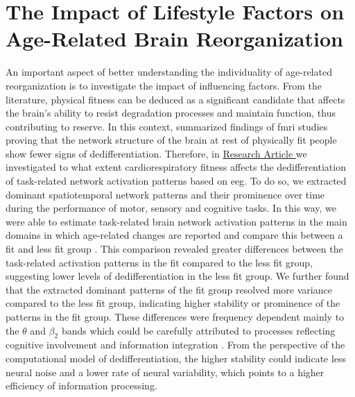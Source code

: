 \section{The Impact of Lifestyle Factors on Age-Related Brain Reorganization}
An important aspect of better understanding the individuality of age-related reorganization is to investigate the impact of influencing factors. From the literature, physical fitness can be deduced as a significant candidate that affects the brain's ability to resist degradation processes and maintain function, thus contributing to reserve. In this context, \citeauthor{Stillman2019} \cite{Stillman2019} summarized findings of \gls{fmri} studies proving that the network structure of the brain at rest of physically fit people show fewer signs of dedifferentiation. Therefore, in \hyperref[results:paperIII]{Research Article } we investigated to what extent cardiorespiratory fitness affects the dedifferentiation of task-related network activation patterns based on \gls{eeg}. To do so, we extracted dominant spatiotemporal network patterns and their prominence over time during the performance of motor, sensory and cognitive tasks. In this way, we were able to estimate task-related brain network activation patterns in the main domains in which age-related changes are reported and compare this between a fit and less fit group \cite{Baltes1997, Sala-Llonch2015, Park2009}. This comparison revealed greater differences between the task-related activation patterns in the fit compared to the less fit group, suggesting lower levels of dedifferentiation in the less fit group. We further found that the extracted dominant patterns of the fit group resolved more variance compared to the less fit group, indicating higher stability or prominence of the patterns in the fit group. These differences were frequency dependent mainly to the $\theta$ and $\beta_2$ bands which could be carefully attributed to processes reflecting cognitive involvement and information integration \cite{Siegel2012}. From the perspective of the computational model of dedifferentiation, the higher stability could indicate less neural noise and a lower rate of neural variability, which points to a higher efficiency of information processing.\\
